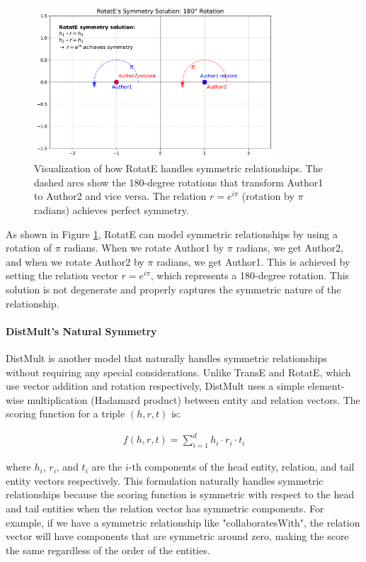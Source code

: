 \documentclass[10pt,a4paper]{article}
\begin{document}
\begin{figure}[H]
    \centering
    \includegraphics[width=0.8\textwidth]{img/rotate_symmetry.pdf}
    \caption{Visualization of how RotatE handles symmetric relationships. The dashed arcs show the 180-degree rotations that transform Author1 to Author2 and vice versa. The relation $r = e^{i\pi}$ (rotation by $\pi$ radians) achieves perfect symmetry.}
    \label{fig:rotate_symmetry}
\end{figure}

As shown in Figure \ref{fig:rotate_symmetry}, RotatE can model symmetric relationships by using a rotation of $\pi$ radians. When we rotate Author1 by $\pi$ radians, we get Author2, and when we rotate Author2 by $\pi$ radians, we get Author1. This is achieved by setting the relation vector $r = e^{i\pi}$, which represents a 180-degree rotation. This solution is not degenerate and properly captures the symmetric nature of the relationship.

\paragraph{DistMult's Natural Symmetry}
DistMult is another model that naturally handles symmetric relationships without requiring any special considerations. Unlike TransE and RotatE, which use vector addition and rotation respectively, DistMult uses a simple element-wise multiplication (Hadamard product) between entity and relation vectors. The scoring function for a triple $(h, r, t)$ is:

\begin{align*}
    f(h, r, t) = \sum_{i=1}^d h_i \cdot r_i \cdot t_i
\end{align*}

where $h_i$, $r_i$, and $t_i$ are the $i$-th components of the head entity, relation, and tail entity vectors respectively. This formulation naturally handles symmetric relationships because the scoring function is symmetric with respect to the head and tail entities when the relation vector has symmetric components. For example, if we have a symmetric relationship like "collaboratesWith", the relation vector will have components that are symmetric around zero, making the score the same regardless of the order of the entities.
\end{document}

